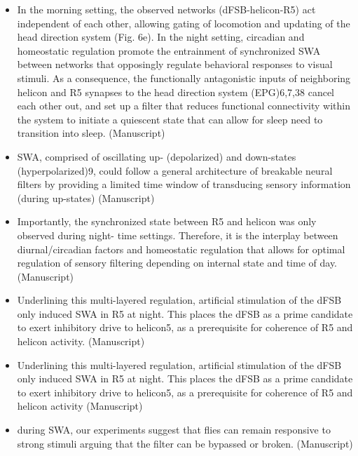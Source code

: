 \documentclass[11pt]{article}
\begin{document}
\begin{itemize}
    \item In the morning setting, the observed networks (dFSB-helicon-R5) act independent of each
    other, allowing gating of locomotion and updating of the head direction system (Fig. 6e). In
    the night setting, circadian and homeostatic regulation promote the entrainment of
    synchronized SWA between networks that opposingly regulate behavioral responses to visual
    stimuli. As a consequence, the functionally antagonistic inputs of neighboring helicon and R5
    synapses to the head direction system (EPG)6,7,38 cancel each other out, and set up a filter that
    reduces functional connectivity within the system to initiate a quiescent state that can allow
    for sleep need to transition into sleep.
    \parencite{raccugliaCoherentMultilevelNetwork2022} (Manuscript)

    \item SWA, comprised of oscillating up- (depolarized) and down-states (hyperpolarized)9, could
    follow a general architecture of breakable neural filters by providing a limited time window of
    transducing sensory information (during up-states)
    \parencite{raccugliaCoherentMultilevelNetwork2022} (Manuscript)

    \item Importantly, the synchronized state between R5 and helicon was only observed during night-
    time settings. Therefore, it is the interplay between diurnal/circadian factors and homeostatic
    regulation that allows for optimal regulation of sensory filtering depending on internal state
    and time of day.
    \parencite{raccugliaCoherentMultilevelNetwork2022} (Manuscript)

    \item Underlining this multi-layered regulation, artificial stimulation of the dFSB
    only induced SWA in R5 at night. This places the dFSB as a prime candidate to exert inhibitory
    drive to helicon5, as a prerequisite for coherence of R5 and helicon activity.
    \parencite{raccugliaCoherentMultilevelNetwork2022} (Manuscript)

    \item Underlining this multi-layered regulation, artificial stimulation of the dFSB
    only induced SWA in R5 at night. This places the dFSB as a prime candidate to exert inhibitory
    drive to helicon5, as a prerequisite for coherence of R5 and helicon activity
    \parencite{raccugliaCoherentMultilevelNetwork2022} (Manuscript)

    \item during SWA, our experiments suggest that flies can remain responsive to strong stimuli arguing that the filter can be
    bypassed or broken.
    \parencite{raccugliaCoherentMultilevelNetwork2022} (Manuscript)


\end{itemize}
\end{document}
